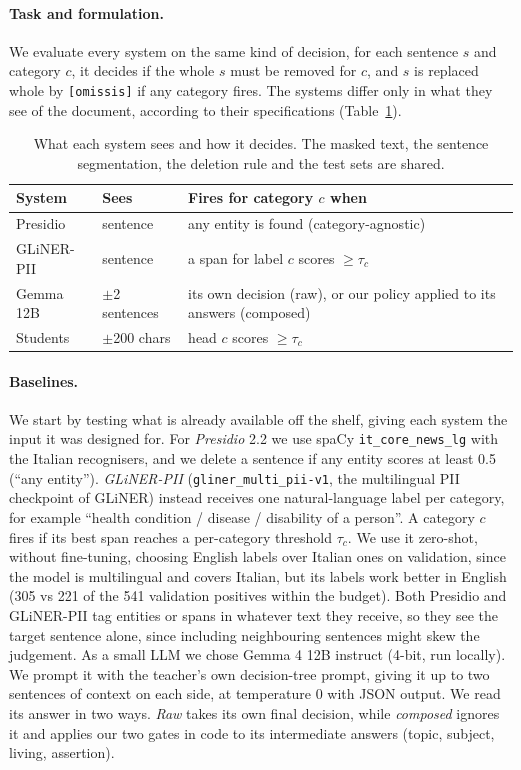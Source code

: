 \documentclass[11pt]{article}
\begin{document}
\paragraph{Task and formulation.} We evaluate every system on the same kind of decision, for each sentence $s$ and category $c$, it decides if the whole $s$ must be removed for $c$, and $s$ is replaced whole by \texttt{[omissis]} if any category fires. The systems differ only in what they see of the document, according to their specifications (Table~\ref{tab:systems}).

\begin{table}[t]
\centering\footnotesize
\setlength{\tabcolsep}{3pt}
\begin{tabular}{lp{}p{}}
\toprule
System & Sees & Fires for category $c$ when \\
\midrule
Presidio & sentence & any entity is found (category-agnostic) \\
GLiNER-PII & sentence & a span for label $c$ scores $\geq \tau_c$ \\
Gemma 12B & $\pm$2 sentences & its own decision (raw), or our policy applied to its answers (composed) \\
Students & $\pm$200 chars & head $c$ scores $\geq \tau_c$ \\
\bottomrule
\end{tabular}
\caption{What each system sees and how it decides. The masked text, the sentence segmentation, the deletion rule and the test sets are shared.}
\label{tab:systems}
\end{table}

\paragraph{Baselines.} We start by testing what is already available off the shelf, giving each system the input it was designed for. For \emph{Presidio} 2.2 we use spaCy \texttt{it\_core\_news\_lg} with the Italian recognisers, and we delete a sentence if any entity scores at least 0.5 (``any entity''). \emph{GLiNER-PII} (\texttt{gliner\_multi\_pii-v1}, the multilingual PII checkpoint of GLiNER) instead receives one natural-language label per category, for example ``health condition / disease / disability of a person''. A category $c$ fires if its best span reaches a per-category threshold $\tau_c$. We use it zero-shot, without fine-tuning, choosing English labels over Italian ones on validation, since the model is multilingual and covers Italian, but its labels work better in English (305 vs 221 of the 541 validation positives within the budget). Both Presidio and GLiNER-PII tag entities or spans in whatever text they receive, so they see the target sentence alone, since including neighbouring sentences might skew the judgement. As a small LLM we chose Gemma 4 12B instruct (4-bit, run locally). We prompt it with the teacher's own decision-tree prompt, giving it up to two sentences of context on each side, at temperature 0 with JSON output. We read its answer in two ways. \emph{Raw} takes its own final decision, while \emph{composed} ignores it and applies our two gates in code to its intermediate answers (topic, subject, living, assertion).
\end{document}
